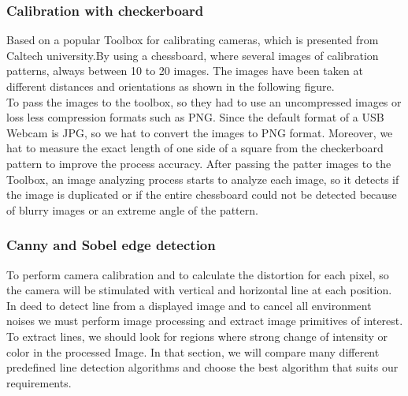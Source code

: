 \documentclass[journal,final,a4paper,twoside]{PS}
\begin{document}
\subsubsection{Calibration with checkerboard}
Based on a popular Toolbox for calibrating cameras, which is presented from Caltech university.By using a chessboard, where several images of calibration patterns, always between 10 to 20 images. The images have been taken at different distances and orientations as shown in the following figure.
\\
To pass the images to the toolbox, so they had to use an uncompressed images or loss less compression formats such as PNG. Since the default format of a USB Webcam is JPG, so we hat to convert the images to PNG format. Moreover, we hat to measure the exact length of one side of a square from the checkerboard pattern to improve the process accuracy. After passing the patter images to the Toolbox, an image analyzing process starts to analyze each image, so it detects if the image is duplicated or if the entire chessboard could not be detected because of blurry images or an extreme angle of the pattern.

\subsubsection{Canny and Sobel edge detection}
To perform camera calibration and to calculate the distortion for each pixel, so the camera will be stimulated with vertical and horizontal line at each position. In deed to detect line from a displayed image and to cancel all environment noises we must perform image processing and extract image primitives of interest. 
To extract lines, we should look for regions where strong change of intensity or color in the processed Image. In that section, we will compare many different predefined line detection algorithms and choose the best algorithm that suits our requirements.
\end{document}
